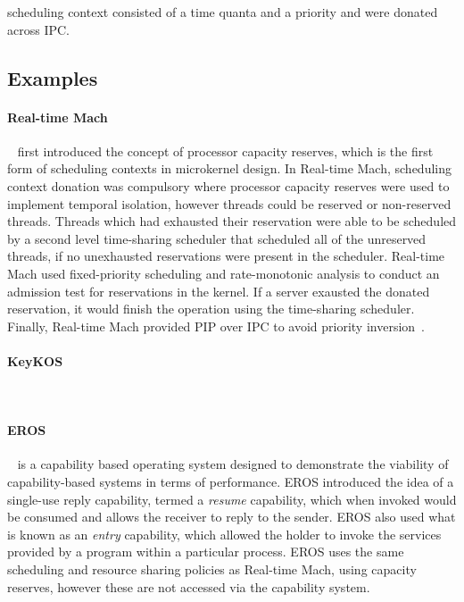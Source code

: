 \citet{Steinberg_WH_05} scheduling context consisted of a time quanta and a priority and were donated across \gls{IPC}.

\subsection{Examples}

\paragraph{Real-time Mach}~\citep{Mercer_RZ_94, Mercer_ST_93} first introduced the concept of processor capacity reserves, which is the first form of scheduling contexts in microkernel design.
In Real-time Mach, scheduling context donation was compulsory where processor capacity reserves were used to implement temporal isolation, however threads could be reserved or non-reserved threads. 
Threads which had exhausted their reservation were able to be scheduled by a second level time-sharing scheduler that scheduled all of the unreserved threads, if no unexhausted reservations were present in the scheduler.
Real-time Mach used fixed-priority scheduling and rate-monotonic analysis to conduct an admission test for reservations in the kernel.
If a server exausted the donated reservation, it would finish the operation using the time-sharing scheduler. 
Finally, Real-time Mach provided \gls{PIP} over \gls{IPC} to avoid priority inversion~\citep{Tokuda_NR_90}.

\paragraph{KeyKOS}~\citep{Bomberger_FFHLS_92}

\paragraph{EROS}~\citep{Shapiro_SF_99} is a capability based operating system designed to demonstrate the viability of capability-based systems in terms of performance. 
EROS introduced the idea of a single-use reply capability, termed a \emph{resume} capability, which when invoked would be consumed and allows the receiver to reply to the sender.
EROS also used what is known as an \emph{entry} capability, which allowed the holder to invoke the services provided by a program within a particular process. 
EROS uses the same scheduling and resource sharing policies as Real-time Mach, using capacity reserves, however these are not accessed via the capability system.

